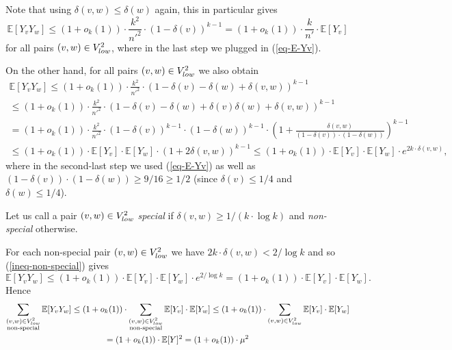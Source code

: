 \documentclass[11pt]{article}
\theoremstyle{definition}
\numberwithin{equation}{section}
\begin{document}
Note that using $\delta(v,w)\leq \delta(w)$ again, this in particular gives
\begin{equation}\label{ineq-special}
\mathbb{E}[Y_vY_w]\leq (1+o_k(1))\cdot\frac{k^2}{n'^2}\cdot(1-\delta(v))^{k-1}=(1+o_k(1))\cdot\frac{k}{n'}\cdot \mathbb{E}[Y_v]
\end{equation}
for all pairs $(v,w)\in V_{\textnormal{low}}^2$, where in the last step we plugged in (\ref{eq-E-Yv}).

On the other hand, for all pairs $(v,w)\in V_{\textnormal{low}}^2$ we also obtain
\begin{multline}\label{ineq-non-special}
\mathbb{E}[Y_vY_w]\leq (1+o_k(1))\cdot \frac{k^2}{n'^2}\cdot(1-\delta(v)-\delta(w)+\delta(v,w))^{k-1}\\
\leq (1+o_k(1))\cdot \frac{k^2}{n'^2}\cdot(1-\delta(v)-\delta(w)+\delta(v)\delta(w)+\delta(v,w))^{k-1}\\
=(1+o_k(1))\cdot \frac{k^2}{n'^2}\cdot(1-\delta(v))^{k-1}\cdot(1-\delta(w))^{k-1}\cdot \left(1+\frac{\delta(v,w)}{(1-\delta(v))\cdot (1-\delta(w))}\right)^{k-1}\\
\leq (1+o_k(1))\cdot\mathbb{E}[Y_v]\cdot \mathbb{E}[Y_w]\cdot (1+2\delta(v,w))^{k-1}\leq (1+o_k(1))\cdot\mathbb{E}[Y_v]\cdot \mathbb{E}[Y_w]\cdot e^{2k\cdot \delta(v,w)},
\end{multline}
where in the second-last step we used (\ref{eq-E-Yv}) as well as $(1-\delta(v))\cdot (1-\delta(w))\geq 9/16\geq 1/2$ (since $\delta(v)\leq 1/4$ and $\delta(w)\leq 1/4$).

Let us call a pair $(v,w)\in V_{\textnormal{low}}^2$ \emph{special} if $\delta(v,w)\geq 1/(k\cdot \log k)$ and  \emph{non-special} otherwise.

For each non-special pair $(v,w)\in V_{\textnormal{low}}^2$ we have $2k\cdot \delta(v,w)< 2/\log k$ and so (\ref{ineq-non-special}) gives
\[\mathbb{E}[Y_vY_w]\leq (1+o_k(1))\cdot\mathbb{E}[Y_v]\cdot \mathbb{E}[Y_w]\cdot e^{2/\log k}=(1+o_k(1))\cdot\mathbb{E}[Y_v]\cdot \mathbb{E}[Y_w].\]
Hence
\begin{multline}\label{ineq-non-special-2}
\sum_{\substack{(v,w)\in V_{\textnormal{low}}^2\\\text{non-special}}}\mathbb{E}[Y_vY_w]\leq (1+o_k(1))\cdot \sum_{\substack{(v,w)\in V_{\textnormal{low}}^2\\\text{non-special}}}\mathbb{E}[Y_v]\cdot \mathbb{E}[Y_w]\leq (1+o_k(1))\cdot \sum_{(v,w)\in V_{\textnormal{low}}^2}\mathbb{E}[Y_v]\cdot \mathbb{E}[Y_w]\\
= (1+o_k(1))\cdot\mathbb{E}[Y]^2=(1+o_k(1))\cdot\mu^2
\end{multline}
\end{document}
